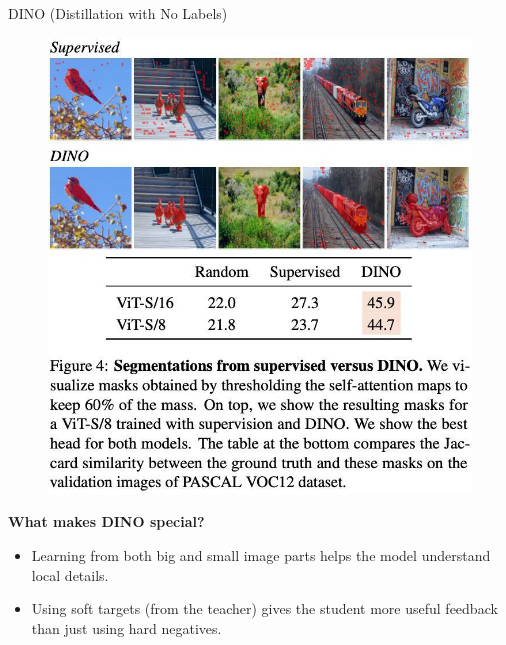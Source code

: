 \begin{frame}[allowframebreaks]{DINO (Distillation with No Labels)}
\framebreak

\begin{figure}
    \centering
    \includegraphics[width=\linewidth,height=0.9\textheight,keepaspectratio]{images/contrastive/slide_90_1_img.jpg}
\end{figure}

\framebreak

\textbf{What makes DINO special?}
\begin{itemize}
    \item Learning from both big and small image parts helps the model understand local details.
    \item Using soft targets (from the teacher) gives the student more useful feedback than just using hard negatives.
\end{itemize}
\end{frame}